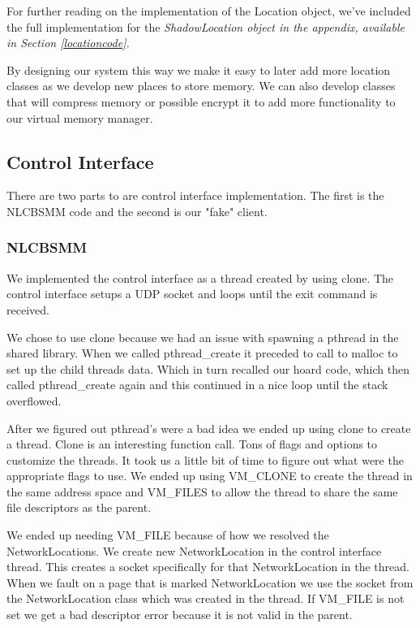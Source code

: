 \documentclass[9pt]{sig-alternate-10pt}
\begin{document}
For further reading on the implementation of the Location object, we've included the full implementation for the \em ShadowLocation \em object in the appendix, available in Section \ref{locationcode}.

By designing our system this way we make it easy to later add more location classes as we develop new places to store memory. We can also develop classes that will compress memory or possible encrypt it to add more functionality to our virtual memory manager. 

\subsection{Control Interface}
There are two parts to are control interface implementation. The first is the NLCBSMM code and the second is our "fake" client.

\subsubsection{NLCBSMM}
We implemented the control interface as a thread created by using clone. The control interface setups a UDP socket and loops until the exit command is received.

We chose to use clone because we had an issue with spawning a pthread in the shared library. When we called pthread\_create it preceded to call to malloc to set up the child threads data. Which in turn recalled our hoard code, which then called pthread\_create again and this continued in a nice loop until the stack overflowed.

After we figured out pthread's were a bad idea we ended up using clone to create a thread. Clone is an interesting function call. Tons of flags and options to customize the threads. It took us a little bit of time to figure out what were the appropriate flags to use. We ended up using VM\_CLONE to create the thread in the same address space and VM\_FILES to allow the thread to share the same file descriptors as the parent. 

We ended up needing  VM\_FILE because of how we resolved the NetworkLocations. We create new NetworkLocation in the control interface thread. This creates a socket specifically for that NetworkLocation in the thread. When we fault on a page that is marked NetworkLocation we use the socket from the NetworkLocation class which was created in the thread. If  VM\_FILE is not set we get a bad descriptor error because it is not valid in the parent.
\end{document}
